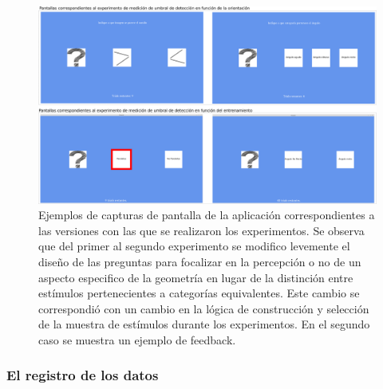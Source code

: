 \documentclass{article}
\begin{document}
    \begin{figure}
        \center
        \includegraphics[width=\textwidth]{Imagenes/Pantallas2.png}
        \caption{Ejemplos de  capturas de pantalla de la aplicación correspondientes a las versiones con las que se realizaron los experimentos. Se observa que del primer al segundo experimento se modifico levemente el diseño de las preguntas para focalizar en la percepción o no de un aspecto especifico de la geometría en lugar de la distinción entre estímulos pertenecientes a categorías equivalentes. Este cambio se correspondió con un cambio en la lógica de construcción y selección de la muestra de estímulos durante los experimentos. En el segundo caso se muestra un ejemplo de feedback.}
        
        \label{fig:Pantallas2}
    \end{figure}
    
    \subsubsection{El registro de los datos}
    
\end{document}
